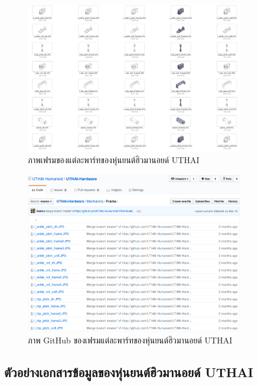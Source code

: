 \begin{figure}[!ht]
	\centering
	\includegraphics[width=0.85\textwidth]{chapter4/images/uthai_manual/uthai_frame.png}
	\caption{ภาพเฟรมของแต่ละพาร์ทของหุ่นยนต์ฮิวมานอยด์ UTHAI}
\end{figure}
\begin{figure}[!ht]
	\centering
	\includegraphics[width=0.85\textwidth]{chapter4/images/uthai_manual/uthai_frame2.png}
	\caption{ภาพ GitHub ของเฟรมแต่ละพาร์ทของหุ่นยนต์ฮิวมานอยด์ UTHAI}
\end{figure}

\clearpage
\subsection{ตัวอย่างเอกสารข้อมูลของหุ่นยนต์ฮิวมานอยด์ UTHAI}

